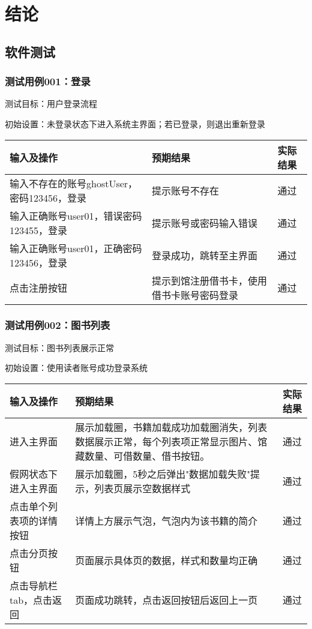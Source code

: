 
\chapter{结论}%
\section{软件测试}
\subsection{测试用例001：登录}
测试目标：用户登录流程

初始设置：未登录状态下进入系统主界面；若已登录，则退出重新登录
\begin{table}[ht]
    \centering
    \begin{tabular*}{0.9\textwidth}{p{}p{}p{}}
        \hline
        输入及操作 & 预期结果 & 实际结果 \\
        \hline
        输入不存在的账号ghostUser，密码123456，登录 & 提示账号不存在 & 通过 \\
        输入正确账号user01，错误密码123455，登录    & 提示账号或密码输入错误 & 通过 \\
        输入正确账号user01，正确密码123456，登录 &  登录成功，跳转至主界面 & 通过 \\
        点击注册按钮 &  提示到馆注册借书卡，使用借书卡账号密码登录 & 通过 \\ 
        \hline
    \end{tabular*}
\end{table}
\subsection{测试用例002：图书列表}
测试目标：图书列表展示正常

初始设置：使用读者账号成功登录系统
\begin{table}[ht]
    \centering
    \begin{tabular*}{0.9\textwidth}{p{}p{}p{}}
        \hline
        输入及操作 & 预期结果 & 实际结果 \\
        \hline
        进入主界面 & 展示加载圈，书籍加载成功加载圈消失，列表数据展示正常，每个列表项正常显示图片、馆藏数量、可借数量、借书按钮。 & 通过 \\
        假网状态下进入主界面 & 展示加载圈，5秒之后弹出"数据加载失败"提示，列表页展示空数据样式 & 通过 \\
        点击单个列表项的详情按钮 &  详情上方展示气泡，气泡内为该书籍的简介 & 通过 \\
        点击分页按钮 &  页面展示具体页的数据，样式和数量均正确 & 通过 \\ 
        点击导航栏tab，点击返回 &  页面成功跳转，点击返回按钮后返回上一页 & 通过 \\ 
        \hline
    \end{tabular*}
\end{table}
\newpage
